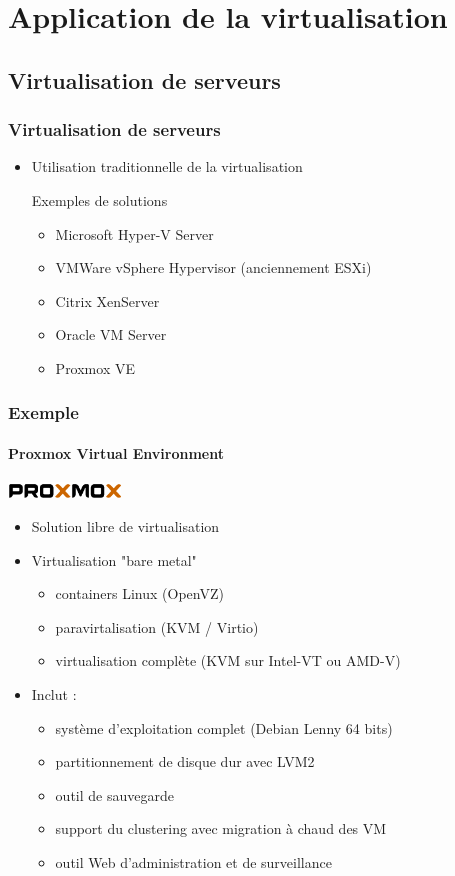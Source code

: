 \section{Application de la virtualisation}

\subsection{Virtualisation de serveurs}

\begin{frame}
\frametitle{Virtualisation de serveurs}
\begin{itemize}
\item Utilisation traditionnelle de la virtualisation
\begin{exampleblock}{Exemples de solutions}
\begin{itemize}
\item Microsoft Hyper-V Server
\item VMWare vSphere Hypervisor (anciennement ESXi)
\item Citrix XenServer
\item Oracle VM Server
\item Proxmox VE
\end{itemize}
\end{exampleblock}
\end{itemize}
\end{frame}

\begin{frame}
\frametitle{Exemple}
\framesubtitle{Proxmox Virtual Environment}
\includegraphics[width=3cm]{../illustration/proxmox_logo.png}
\begin{itemize}
\item Solution libre de virtualisation
\item Virtualisation "bare metal"
\begin{itemize}
\item containers Linux (OpenVZ)
\item paravirtalisation (KVM / Virtio)
\item virtualisation complète (KVM sur Intel-VT ou AMD-V)
\end{itemize}
\item Inclut :
\begin{itemize}
\item système d'exploitation complet (Debian Lenny 64 bits)
\item partitionnement de disque dur avec LVM2
\item outil de sauvegarde
\item support du clustering avec migration à chaud des VM
\item outil Web d'administration et de surveillance
\end{itemize}
\end{itemize}
\end{frame}


